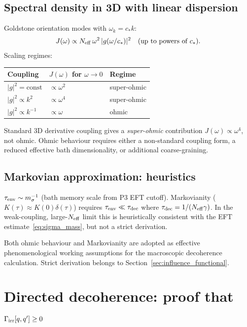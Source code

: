 \documentclass[11pt,a4paper]{article}
\numberwithin{equation}{section}
\begin{document}
\subsection*{Spectral density in 3D with linear dispersion}

Goldstone orientation modes with $\omega_k=c_*k$:
\begin{equation}
  J(\omega)\propto N_{\rm eff}\,\omega^2\,|g(\omega/c_*)|^2
  \quad\text{(up to powers of }c_*\text{)}.
\end{equation}
Scaling regimes:
\begin{center}
\renewcommand{\arraystretch}{1.3}
\begin{tabular}{lll}
\hline
Coupling & $J(\omega)$ for $\omega\to 0$ & Regime \\
\hline
$|g|^2=\text{const}$ & $\propto\omega^2$ & super-ohmic \\
$|g|^2\propto k^2$ & $\propto\omega^4$ & super-ohmic \\
$|g|^2\propto k^{-1}$ & $\propto\omega$ & ohmic \\
\hline
\end{tabular}
\end{center}
Standard 3D derivative coupling gives a \emph{super-ohmic} contribution
$J(\omega)\propto\omega^4$, not ohmic.
Ohmic behaviour requires either a non-standard coupling form,
a reduced effective bath dimensionality, or additional coarse-graining.

\subsection*{Markovian approximation: heuristics}

$\tau_{\rm env}\sim m_\sigma^{-1}$ (bath memory scale from P3 EFT cutoff).
Markovianity ($K(\tau)\approx K(0)\delta(\tau)$) requires $\tau_{\rm env}\ll\tau_{\rm dec}$
where $\tau_{\rm dec}=1/(N_{\rm eff}\gamma)$.
In the weak-coupling, large-$N_{\rm eff}$ limit this is heuristically consistent
with the EFT estimate~\eqref{eq:sigma_mass}, but not a strict derivation.

Both ohmic behaviour and Markovianity are adopted as effective phenomenological
working assumptions for the macroscopic decoherence calculation.
Strict derivation belongs to Section~\ref{sec:influence_functional}.


\section{Directed decoherence: proof that
  $\Gamma_{\rm irr}[q,q']\geq 0$}
\label{app:directed_decoherence}
\end{document}
